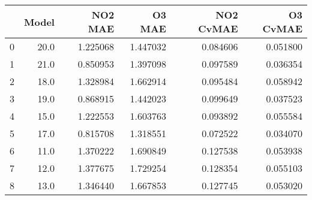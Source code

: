 \begin{tabular}{lrrrrr}
\toprule
{} &  Model &   NO2 MAE &    O3 MAE &  NO2 CvMAE &  O3 CvMAE \\
\midrule
0 &   20.0 &  1.225068 &  1.447032 &   0.084606 &  0.051800 \\
1 &   21.0 &  0.850953 &  1.397098 &   0.097589 &  0.036354 \\
2 &   18.0 &  1.328984 &  1.662914 &   0.095484 &  0.058942 \\
3 &   19.0 &  0.868915 &  1.442023 &   0.099649 &  0.037523 \\
4 &   15.0 &  1.222553 &  1.603763 &   0.093892 &  0.055584 \\
5 &   17.0 &  0.815708 &  1.318551 &   0.072522 &  0.034070 \\
6 &   11.0 &  1.370222 &  1.690849 &   0.127538 &  0.053938 \\
7 &   12.0 &  1.377675 &  1.729254 &   0.128354 &  0.055103 \\
8 &   13.0 &  1.346440 &  1.667853 &   0.127745 &  0.053020 \\
\bottomrule
\end{tabular}

